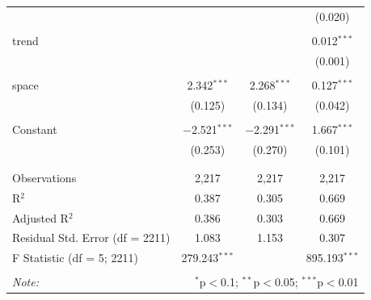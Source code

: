 \documentclass[12pt]{article}
\begin{document}
\begin{table}[!htbp]
\begin{tabular}{@{\extracolsep{5pt}}lccc}
  &  &  & (0.020) \\ 
  & & & \\ 
 trend &  &  & 0.012$^{***}$ \\ 
  &  &  & (0.001) \\ 
  & & & \\ 
 space & 2.342$^{***}$ & 2.268$^{***}$ & 0.127$^{***}$ \\ 
  & (0.125) & (0.134) & (0.042) \\ 
  & & & \\ 
 Constant & $-$2.521$^{***}$ & $-$2.291$^{***}$ & 1.667$^{***}$ \\ 
  & (0.253) & (0.270) & (0.101) \\ 
  & & & \\ 
\hline \\[-1.8ex] 
Observations & 2,217 & 2,217 & 2,217 \\ 
R$^{2}$ & 0.387 & 0.305 & 0.669 \\ 
Adjusted R$^{2}$ & 0.386 & 0.303 & 0.669 \\ 
Residual Std. Error (df = 2211) & 1.083 & 1.153 & 0.307 \\ 
F Statistic (df = 5; 2211) & 279.243$^{***}$ &  & 895.193$^{***}$ \\ 
\hline 
\hline \\[-1.8ex] 
\textit{Note:}  & \multicolumn{3}{r}{$^{*}$p$<$0.1; $^{**}$p$<$0.05; $^{***}$p$<$0.01} \\ 
\end{tabular} 
\end{table} 
\end{document}
